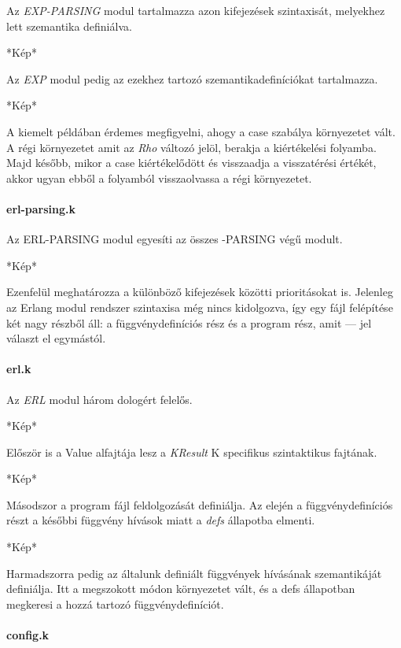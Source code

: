 Az \textit{EXP-PARSING} modul tartalmazza azon kifejezések szintaxisát, melyekhez lett szemantika definiálva.

*Kép*

Az \textit{EXP} modul pedig az ezekhez tartozó szemantikadefiníciókat tartalmazza.

*Kép*

A kiemelt példában érdemes megfigyelni, ahogy a case szabálya környezetet vált. A régi környezetet amit az \textit{Rho} változó jelöl, berakja a kiértékelési folyamba. Majd később, mikor a case kiértékelődött és visszaadja a visszatérési értékét, akkor ugyan ebből a folyamból visszaolvassa a régi környezetet.

\paragraph{erl-parsing.k}

Az ERL-PARSING modul egyesíti az összes -PARSING végű modult.

*Kép*

Ezenfelül meghatározza a különböző kifejezések közötti prioritásokat is. Jelenleg az Erlang modul rendszer szintaxisa még nincs kidolgozva, így egy fájl felépítése két nagy részből áll: a függvénydefiníciós rész és a program rész, amit --- jel választ el egymástól.

\paragraph{erl.k}

Az \textit{ERL} modul három dologért felelős.

*Kép*

Először is a Value alfajtája lesz a \textit{KResult} K specifikus szintaktikus fajtának.

*Kép*

Másodszor a program fájl feldolgozását definiálja. Az elején a függvénydefiníciós részt a későbbi függvény hívások miatt a \textit{defs} állapotba elmenti.

*Kép*

Harmadszorra pedig az általunk definiált függvények hívásának szemantikáját definiálja. Itt a megszokott módon környezetet vált, és a defs állapotban megkeresi a hozzá tartozó függvénydefiníciót.


\paragraph{config.k}

